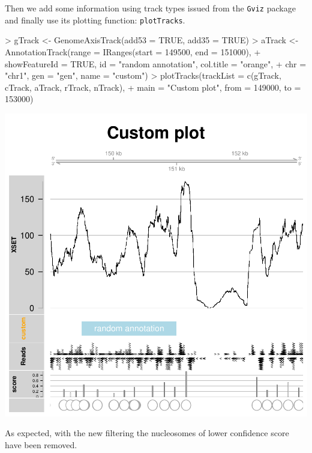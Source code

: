 \documentclass[11pt]{article}
\begin{document}
Then we add some information using track types issued from the \texttt{Gviz} package and finally use its plotting function: \texttt{plotTracks}.
\begin{Schunk}
\begin{Sinput}
> gTrack <- GenomeAxisTrack(add53 = TRUE, add35 = TRUE)
> aTrack <- AnnotationTrack(range = IRanges(start = 149500, end = 151000), 
+     showFeatureId = TRUE, id = "random annotation", col.title = "orange", 
+     chr = "chr1", gen = "gen", name = "custom")
> plotTracks(trackList = c(gTrack, cTrack, aTrack, rTrack, nTrack), 
+     main = "Custom plot", from = 149000, to = 153000)
\end{Sinput}
\end{Schunk}
\includegraphics{PING-Gviz-tracks}

As expected, with the new filtering the nucleosomes of lower confidence score have been removed.
\end{document}
